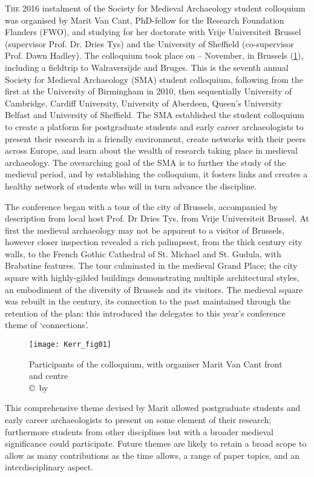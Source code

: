 \documentclass[%
	]{ijsra}
\begin{document}
\IJSRAopening%
\lettrine{T}{he} 2016 instalment of the Society for Medieval Archaeology student colloquium was organised by Marit Van Cant, PhD-fellow for the Research Foundation Flanders (FWO), and studying for her doctorate with Vrije Universiteit Brussel (supervisor Prof. Dr. Dries Tys) and the University of Sheffield (co-supervisor Prof. Dawn Hadley). 
The colloquium took place on – November, in Brussels (\cref{fig:Kerr_fig01}), including a fieldtrip to Walraversijde and Bruges. This is the seventh annual Society for Medieval Archaeology (SMA) student colloquium, following from the first at the University of Birmingham in 2010, then sequentially University of Cambridge, Cardiff University, University of Aberdeen, Queen’s University Belfast and University of Sheffield. The SMA established the student colloquium to create a platform for postgraduate students and early career archaeologists to present their research in a friendly environment, create networks with their peers across Europe, and learn about the wealth of research taking place in medieval archaeology. The overarching goal of the SMA is to further the study of the medieval period, and by establishing the colloquium, it fosters links and creates a healthy network of students who will in turn advance the discipline.

The conference began with a tour of the city of Brussels, accompanied by description from local host Prof. Dr Dries Tys, from Vrije Universiteit Brussel. At first the medieval archaeology may not be apparent to a visitor of Brussels, however closer inspection revealed a rich palimpsest, from the thick  century city walls, to the French Gothic Cathedral of St. Michael and St. Gudula, with Brabatine features. The tour culminated in the medieval Grand Place; the city square with highly-gilded buildings demonstrating multiple architectural styles, an embodiment of the diversity of Brussels and its visitors. The medieval square was rebuilt in the  century, its connection to the past maintained through the retention of the plan: this introduced the delegates to this year’s conference theme of ‘connections’. 

\begin{figure}[!tb]
\texttt{[image: Kerr\_fig01]}
\caption{Participants of the colloquium, with organiser Marit Van Cant front and centre
        {\normalfont\scriptsize \\ \copyright\ by 
                 \shortauthor
                  }}
\label{fig:Kerr_fig01}
\end{figure}
This comprehensive theme devised by Marit allowed postgraduate students and early career archaeologists to present on some element of their research; furthermore students from other disciplines but with a broader medieval significance could participate. Future themes are likely to retain a broad scope to allow as many contributions as the time allows, a range of paper topics, and an interdisciplinary aspect. 
\end{document}
